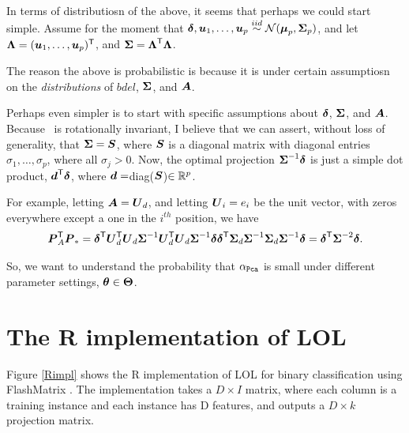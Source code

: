 \documentclass[10pt]{article}
\begin{document}
In terms of distributiosn of the above, it seems that perhaps we could start simple.
Assume for the moment that $\boldsymbol{\delta},\boldsymbol{u}_1,\ldots,\boldsymbol{u}_p \overset{iid}{\sim} \mathcal{N}(\boldsymbol{\mu}_p, \boldsymbol{\Sigma}_p)$, and let $\boldsymbol{\Lambda}=(\boldsymbol{u}_1,\ldots,\boldsymbol{u}_p)^{\mathsf{T}}$, and $\boldsymbol{\Sigma} = \boldsymbol{\Lambda}^{\mathsf{T}} \boldsymbol{\Lambda}$.

The reason the above is probabilistic is because it is under certain assumptiosn on the \emph{distributions} of $bdel$, $\boldsymbol{\Sigma}$, and $\boldsymbol{A}$.


Perhaps even simpler is to start with specific assumptions about $\boldsymbol{\delta}$, $\boldsymbol{\Sigma}$, and $\boldsymbol{A}$. Because \Lda~is rotationally invariant, I believe that we can assert, without loss of generality, that $\boldsymbol{\Sigma}=\boldsymbol{S}$, where $\boldsymbol{S}$ is a diagonal matrix with diagonal entries $\sigma_1,\ldots, \sigma_p$, where all $\sigma_j > 0$.
Now, the optimal projection $\boldsymbol{\Sigma}^{-1} \boldsymbol{\delta}$ is just a simple dot product,  $\boldsymbol{d}^{\mathsf{T}} \boldsymbol{\delta}$, where $\boldsymbol{d}=$diag($\boldsymbol{S}$)$\in \mathbb{R}^p$.


For example, letting $\boldsymbol{A}=\boldsymbol{U}_d$, and letting $\boldsymbol{U}_i=e_i$ be the unit vector, with zeros everywhere except a one in the $i^{th}$ position,  we have
\begin{align*}
\bP_A\T \bP_* %
= \bdel\T \bU_d\T \bU_d \bSig^{-1} \bU_d\T \bU_d \bSig^{-1} \bdel %
\bdel\T \bSig_d \bSig^{-1} \bSig_d \bSig^{-1} \bdel %
= \bdel\T \bSig^{-2} \bdel.
\end{align*}






So, we want to understand the probability that $\alpha_{{\sc \texttt{Pca}}}$ is small under different parameter settings, $\boldsymbol{\theta} \in \boldsymbol{\Theta}$.


\section{The R implementation of LOL}

Figure \ref{Rimpl} shows the R implementation of LOL for binary classification
using FlashMatrix \cite{flashmatrix}. The implementation takes a $D \times I$
matrix, where each column is a training instance and each instance has D
features, and outputs a $D \times k$ projection matrix.
\end{document}
